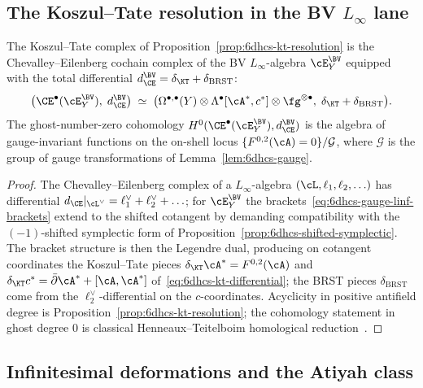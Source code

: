 \subsection{The Koszul--Tate resolution in the BV $L_\infty$ lane}
\label{subsec:vol2-bvbrst-6dhcs-kt-linf}

\begin{theorem}
\label{thm:6dhcs-kt-linf}
The Koszul--Tate complex of
Proposition~\ref{prop:6dhcs-kt-resolution} is the
Chevalley--Eilenberg cochain complex of the BV $L_\infty$-algebra
$\cE^{\BV}_Y$ equipped with the total differential
$d_{\CE}^{\BV} = \delta_{\KT} + \delta_{\mathrm{BRST}}$:
\begin{equation}\label{eq:6dhcs-kt-ce}
 \bigl(\CE^\bullet(\cE^{\BV}_Y),\;d_{\CE}^{\BV}\bigr)
 \;\simeq\;
 \bigl(\Omega^{\bullet,\bullet}(Y)\otimes\Lambda^\bullet
 [\cA^*,c^*]\otimes\fg^{\otimes\bullet},\;
 \delta_{\KT} + \delta_{\mathrm{BRST}}\bigr).
\end{equation}
The ghost-number-zero cohomology
$H^0(\CE^\bullet(\cE^{\BV}_Y),d_{\CE}^{\BV})$ is the algebra of
gauge-invariant functions on the on-shell locus
$\{F^{0,2}(\cA) = 0\}/\mathcal{G}$, where $\mathcal{G}$ is the group
of gauge transformations of Lemma~\ref{lem:6dhcs-gauge}.
\end{theorem}

\begin{proof}
The Chevalley--Eilenberg complex of a $L_\infty$-algebra
$(\cL,\ell_1,\ell_2,\ldots)$ has differential
$d_{\CE}|_{\cL^\vee} = \ell_1^\vee + \ell_2^\vee + \ldots$; for
$\cE^{\BV}_Y$ the brackets~\eqref{eq:6dhcs-gauge-linf-brackets} extend
to the shifted cotangent by demanding compatibility with the
$(-1)$-shifted symplectic form of
Proposition~\ref{prop:6dhcs-shifted-symplectic}. The bracket
structure is then the Legendre dual, producing on cotangent
coordinates the Koszul--Tate pieces
$\delta_{\KT}\cA^* = F^{0,2}(\cA)$ and
$\delta_{\KT}c^* = \bar\partial\cA^* + [\cA,\cA^*]$
of~\eqref{eq:6dhcs-kt-differential}; the BRST pieces
$\delta_{\mathrm{BRST}}$ come from the $\ell_2^\vee$-differential on
the $c$-coordinates. Acyclicity in positive antifield degree is
Proposition~\ref{prop:6dhcs-kt-resolution}; the cohomology statement
in ghost degree $0$ is classical Henneaux--Teitelboim
homological reduction~\cite[\S10.2,\S10.4]{HenneauxTeitelboim1992}.
\end{proof}

\subsection{Infinitesimal deformations and the Atiyah class}
\label{subsec:vol2-bvbrst-6dhcs-def}

